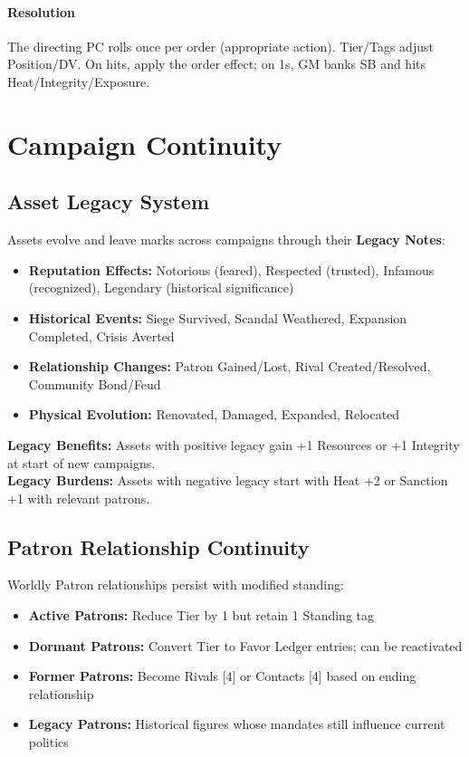   \paragraph{Resolution} The directing PC rolls once per order (appropriate action). Tier/Tags adjust Position/DV. On hits, apply the order effect; on 1s, GM banks SB and hits Heat/Integrity/Exposure.
  
  \section{Campaign Continuity}
  \subsection{Asset Legacy System}
  Assets evolve and leave marks across campaigns through their \textbf{Legacy Notes}:
  \begin{itemize}
    \item \textbf{Reputation Effects:} Notorious (feared), Respected (trusted), Infamous (recognized), Legendary (historical significance)
    \item \textbf{Historical Events:} Siege Survived, Scandal Weathered, Expansion Completed, Crisis Averted
    \item \textbf{Relationship Changes:} Patron Gained/Lost, Rival Created/Resolved, Community Bond/Feud
    \item \textbf{Physical Evolution:} Renovated, Damaged, Expanded, Relocated
  \end{itemize}
  
  \textbf{Legacy Benefits:} Assets with positive legacy gain +1 Resources or +1 Integrity at start of new campaigns.\\
  \textbf{Legacy Burdens:} Assets with negative legacy start with Heat +2 or Sanction +1 with relevant patrons.
  
  \subsection{Patron Relationship Continuity}
  Worldly Patron relationships persist with modified standing:
  \begin{itemize}
    \item \textbf{Active Patrons:} Reduce Tier by 1 but retain 1 Standing tag
    \item \textbf{Dormant Patrons:} Convert Tier to Favor Ledger entries; can be reactivated
    \item \textbf{Former Patrons:} Become Rivals [4] or Contacts [4] based on ending relationship
    \item \textbf{Legacy Patrons:} Historical figures whose mandates still influence current politics
  \end{itemize}
  
